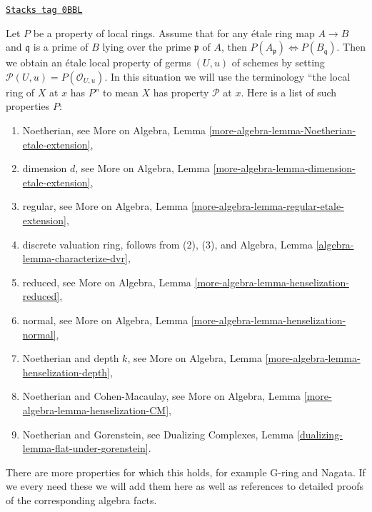 \begin{remark}
\label{spaces-properties-remark-list-properties-local-ring-local-etale-topology}
\href{https://stacks.math.columbia.edu/tag/0BBL}{\texttt{Stacks tag 0BBL}}

Let $P$ be a property of local rings. Assume that for any
\'etale ring map $A \to B$ and $\mathfrak q$ is a prime of $B$ lying over
the prime $\mathfrak p$ of $A$, then
$P(A_\mathfrak p) \Leftrightarrow P(B_\mathfrak q)$.
Then we obtain an \'etale local property of germs $(U, u)$ of schemes
by setting $\mathcal{P}(U, u) = P(\mathcal{O}_{U, u})$.
In this situation we will use the terminology
``the local ring of $X$ at $x$ has $P$'' to mean
$X$ has property $\mathcal{P}$ at $x$.
Here is a list of such properties $P$:
\begin{enumerate}
\item Noetherian, see
More on Algebra, Lemma \ref{more-algebra-lemma-Noetherian-etale-extension},
\item dimension $d$, see
More on Algebra, Lemma \ref{more-algebra-lemma-dimension-etale-extension},
\item regular, see
More on Algebra, Lemma \ref{more-algebra-lemma-regular-etale-extension},
\item discrete valuation ring, follows from (2), (3), and
Algebra, Lemma \ref{algebra-lemma-characterize-dvr},
\item reduced, see
More on Algebra, Lemma \ref{more-algebra-lemma-henselization-reduced},
\item normal, see
More on Algebra, Lemma \ref{more-algebra-lemma-henselization-normal},
\item Noetherian and depth $k$, see
More on Algebra, Lemma \ref{more-algebra-lemma-henselization-depth},
\item Noetherian and Cohen-Macaulay, see
More on Algebra, Lemma \ref{more-algebra-lemma-henselization-CM},
\item Noetherian and Gorenstein, see
Dualizing Complexes, Lemma \ref{dualizing-lemma-flat-under-gorenstein}.
\end{enumerate}
There are more properties for which this holds, for example G-ring and
Nagata. If we every need these we will add them here
as well as references to detailed proofs of the corresponding
algebra facts.
\end{remark}

